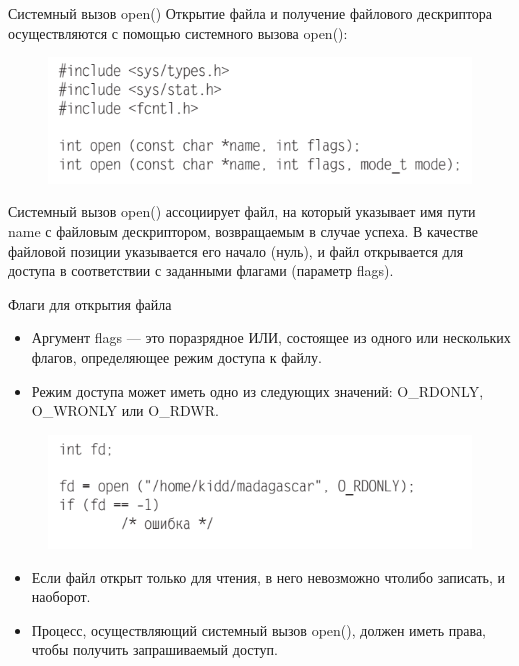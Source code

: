 \documentclass{beamer}
\begin{document}
\begin{frame}{Системный вызов open()}
Открытие файла и получение файлового дескриптора осуществляются с помощью системного вызова open():
\begin{figure}[h]
\centering
\includegraphics[scale=0.6]{images/lec06-pic01.png}
\end{figure}
Системный вызов open() ассоциирует файл, на который указывает имя пути name
с файловым дескриптором, возвращаемым в случае успеха. В качестве файловой  позиции указывается его начало (нуль), и файл открывается для доступа в соответствии с заданными флагами (параметр flags).
\end{frame}

\begin{frame}{Флаги для открытия файла}
\begin{itemize}
\item Аргумент flags — это поразрядное ИЛИ, состоящее из одного или нескольких флагов, определяющее режим доступа к файлу. 
\item Режим доступа может иметь одно из следующих значений: O\_RDONLY, O\_WRONLY или O\_RDWR.
\end{itemize}
\begin{figure}[h]
\centering
\includegraphics[scale=0.6]{images/lec06-pic02.png}
\end{figure}
\begin{itemize}
\item Если файл открыт только для чтения, в него невозможно что­либо записать, и наоборот. 
\item Процесс, осуществляющий системный вызов open(), должен иметь права, чтобы получить запрашиваемый доступ. 
\end{itemize}
\end{frame}
\end{document}

